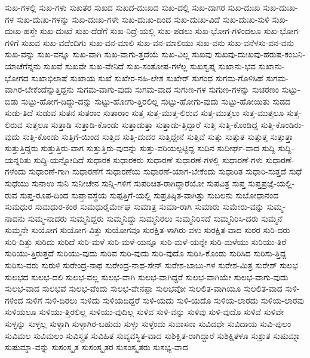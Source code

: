 {ಸುಖ-ಗಳಲ್ಲಿ
ಸುಖ-ಗಳು
ಸುಖತರ
ಸುಖದ
ಸುಖದ-ದುಃಖದ
ಸುಖ-ದಲ್ಲಿ
ಸುಖ-ದಾಗರ
ಸುಖ-ದುಃಖ
ಸುಖ-ದುಃಖ-ಗಳ
ಸುಖ-ದುಃಖ-ಗಳನ್ನು
ಸುಖ-ದುಃಖ-ಗಳೇ
ಸುಖ-ದುಃಖ-ದಿಂದ
ಸುಖ-ದುಃಖ-ವಿದೆ
ಸುಖ-ದುಃಖ-ಸುಳಿ
ಸುಖ-ದುಃಖ-ಹಸ್ತೇ
ಸುಖ-ದುಃಖೆ
ಸುಖ-ದೆಡೆಗೆ
ಸುಖ-ನಿದ್ರೆ-ಯಲ್ಲಿ
ಸುಖ-ಪಡಲು
ಸುಖ-ಭೋಗ-ಗಳಿಂದಲೂ
ಸುಖ-ಭೋಗ-ಗಳಿಗೆ
ಸುಖವ
ಸುಖ-ವದೆಂದಿಗು
ಸುಖ-ವನ-ಮಾಲಿ
ಸುಖ-ವನ-ಮಾಲಿಯು
ಸುಖ-ವನು
ಸುಖ-ವನೆಳಸು-ವನ-ವನು
ಸುಖ-ವನ್ನು
ಸುಖ-ವನ್ನೂ
ಸುಖ-ವಾಗಿ
ಸುಖ-ವಾಗು-ತ್ತದೆಯೆ
ಸುಖ-ವಿಲ್ಲ
ಸುಖವು
ಸುಖವು-ದುಃಖವು-ಹರುಷ-ಕಂಬನಿ-ಯಾಚೆಗೆನ್ನನು
ಸುಖವೆ
ಸುಖವೇ
ಸುಖ-ವೇನಿದೆ
ಸುಖ-ಸಂತೋಷ-ಗಳೆಲ್ಲ
ಸುಖಸ್ವಪ್ನ
ಸುಖಾನು-ಭವ
ಸುಖಾನು-ಭೋಗದ
ಸುಖಾಭಿಲಾಷೆ
ಸುಖಾಯ
ಸುಖೆ
ಸುಖೇರ-ನಹಿ-ಲೇಶ
ಸುಖೇರ್
ಸುಗಂಧ
ಸುಗಮ-ಗೊಳಿಸಿಹೆ
ಸುಗಮ-ವಾಗಿರ-ಬೇಕೆಂದೆನ್ನುತ್ತಿದ್ದನು
ಸುಗಮ-ವಾಗು-ವುದು
ಸುಗಮ-ವಾದ
ಸುಗುಣ-ಗಳ
ಸುಗುಣ-ಗಳನ್ನು
ಸುಚರಣಂ
ಸುಟ್ಟು-ಬಿಡು
ಸುಟ್ಟು-ಹೋಗ-ದಿದ್ದು-ದನ್ನು
ಸುಟ್ಟು-ಹೋಗು-ತ್ತಿರಲಿಲ್ಲ
ಸುಟ್ಟು-ಹೋಗು-ವುದು
ಸುಟ್ಟು-ಹೋಯಿತು
ಸುಡದ
ಸುಡು-ತಿದೆ
ಸುಡುವ
ಸುತನ
ಸುತರಾಂ
ಸುತಾರಾಂ
ಸುತ್ತ
ಸುತ್ತ-ಮುತ್ತ-ಲಿರುವ
ಸುತ್ತ-ಮುತ್ತಲು
ಸುತ್ತ-ಮುತ್ತಲೂ
ಸುತ್ತ-ಲಿರುವ
ಸುತ್ತಲೂ
ಸುತ್ತಾಡಿ
ಸುತ್ತಾಡಿ-ಕೊಂಡು
ಸುತ್ತಾಡುತ್ತಾ
ಸುತ್ತಾಡು-ತ್ತಿದ್ದಾರೆ
ಸುತ್ತಿ
ಸುತ್ತಿ-ಕೊಂಡಿದ್ದ
ಸುತ್ತಿ-ಕೊಂಡಿರು-ವುದು
ಸುತ್ತಿ-ಕೊಂಡು
ಸುತ್ತಿಗೆ-ಯಿಂದ
ಸುತ್ತಿದ
ಸುತ್ತಿ-ದುದರ
ಸುತ್ತಿದ್ದೇನೆ
ಸುತ್ತಿವೆ
ಸುತ್ತು
ಸುತ್ತುತ
ಸುತ್ತುತ್ತ
ಸುತ್ತುತ್ತಾ
ಸುತ್ತುತ್ತಿದ್ದರು
ಸುತ್ತುತ್ತಿರು-ವಾಗ
ಸುತ್ತುತ್ತಿರು-ವುದನ್ನು
ಸುತ್ತು-ವರಿಯಲ್ಪಟ್ಟಿದ್ದ
ಸುದಿನ
ಸುದೀರ್ಘ-ವಾದ
ಸುದ್ದಿ
ಸುದ್ದಿ-ಯನ್ನರಿತು
ಸುದ್ದಿ-ಯನ್ನೋದಿದೆ
ಸುಧಾರಕ
ಸುಧಾರಕರು
ಸುಧಾರಣೆ
ಸುಧಾರಣೆ-ಗಳಲ್ಲಿ
ಸುಧಾರಣೆ-ಗಳು
ಸುಧಾರಣೆ-ಗಳೆಂದು
ಸುಧಾರಣೆ-ಗಾಗಿ
ಸುಧಾರಣೆಗೆ
ಸುಧಾರಣೆಯ
ಸುಧಾರಣೆ-ಯಾಗ-ಬೇಕೆಂದು
ಸುಧಾರಿತ
ಸುಧಾರಿ-ಸುತ್ತದೆ
ಸುಧೆ
ಸುಧೆಯು
ಸುನಾಉ
ಸುನಿ
ಸುನೀಚೇನ
ಸುನ್ನಿ-ಗಳಿಗೆ
ಸುಪರಿಚಿತ-ರಾಗಿದ್ದಾರೆಯೋ
ಸುಪವಿತ್ರ
ಸುಪ್ತ
ಸುಪ್ತಪ್ರಜ್ಞೆ-ಯಲ್ಲಿ-ರುವ
ಸುಪ್ತ-ರೂಪ-ದಿಂದ
ಸುಪ್ತಾವಸ್ಥೆಯ
ಸುಪ್ಪತ್ತಿಗೆ-ಯಲ್ಲಿ
ಸುಪ್ರತಿಷ್ಠಿತ-ವಾಗಿತ್ತು
ಸುಬಲನು
ಸುಬೋಧಾನಂದ
ಸುಮಧುರ
ಸುಮಧುರ-ಕಂಠ
ಸುಮಧುರೈರ್ಮೇಘ
ಸುಮಾತ್ರ
ಸುಮಾ-ರಾಗಿ
ಸುಮಾರು
ಸುಮೇರು-ವನ್ನು
ಸುಮ್ಮ-ನಾದನು
ಸುಮ್ಮ-ನಾದರು
ಸುಮ್ಮನಿದ್ದರು
ಸುಮ್ಮನಿದ್ದು
ಸುಮ್ಮನಿರಲು
ಸುಮ್ಮನಿರಿಸದೆ
ಸುಮ್ಮನಿರಿಸಿ-ದರು
ಸುಮ್ಮನೆ
ಸುಮ್ಮನೇ
ಸುಯೋಗ
ಸುಯೋಗ-ವಿತ್ತು
ಸುಯೋಗವೂ
ಸುರಕ್ಷಿತ-ಳಾಗಿರು-ವಳು
ಸುರಕ್ಷಿತ-ವಾದ
ಸುರರ
ಸುರಿ-ದರು
ಸುರಿ-ದಿತ್ತು
ಸುರಿದು
ಸುರಿದೆ
ಸುರಿ-ಮಳೆ
ಸುರಿ-ಮಳೆ-ಯನ್ನೂ
ಸುರಿ-ಮಳೆ-ಯನ್ನೇ
ಸುರಿ-ಮಳೆಯು
ಸುರಿಯು-ತಿರೆ
ಸುರಿಯು-ತ್ತಿರುತ್ತದೆ
ಸುರಿಯು-ವುದು
ಸುರಿವ
ಸುರಿ-ವುದು
ಸುರಿ-ವುದೊ
ಸುರಿಸಿ-ಕೊಂಡು
ಸುರಿಸಿದ
ಸುರಿಸು-ತ್ತಿದ್ದ
ಸುರಿಸು-ವರು
ಸುರುಳಿ
ಸುರೇಂದ್ರ-ನಾಥ
ಸುರೇಂದ್ರ-ನಾಥ-ಸೇನ್
ಸುರೇಶ-ಬಾಬು-ಗಳ
ಸುರೇಶ-ಮಿತ್ರ
ಸುರೇಶ್
ಸುಲಭ
ಸುಲಭದ
ಸುಲಭ-ದಲಿ
ಸುಲಭ-ವಲ್ಲ
ಸುಲಭ-ವಾಗಿ
ಸುಲಭ-ವಾಗಿದ್ದರೆ
ಸುಲಭ-ವಾಗಿಯೇ
ಸುಲಭ-ವಾಗು-ವುದು
ಸುಲಭ-ವಾದ
ಸುಲಭವೆ
ಸುಲಭ-ವೆಂದು
ಸುಲಭ-ವೇನಪ್ಪಾ
ಸುಲಭವೋ
ಸುಲಲಿತ-ವಾಗಿಯೂ
ಸುಲಲಿತ-ವಾದ
ಸುಳಿ-ಗಳಿಂದ
ಸುಳಿಗೆ
ಸುಳಿ-ದಿರಲು
ಸುಳಿದು
ಸುಳಿಯದಿದ್ದರೆ
ಸುಳಿ-ಯದು
ಸುಳಿ-ಯದೊ
ಸುಳಿಯ-ಲಾರದು
ಸುಳಿಯ-ಲಾರವು
ಸುಳಿಯಲೂ
ಸುಳಿಯು-ತ್ತಿರಲಿಲ್ಲ
ಸುಳಿಯು-ವುದಿಲ್ಲ
ಸುಳಿವ
ಸುಳಿ-ವನ್ನು
ಸುಳಿವು
ಸುಳಿ-ವುದೊ
ಸುಳಿವೆ
ಸುಳಿವೇ
ಸುಳ್ಳನ್ನು
ಸುಳ್ಳಲ್ಲ
ಸುಳ್ಳಾಗಿ
ಸುಳ್ಳಾಗಿರ-ಬಹುದು
ಸುಳ್ಳು
ಸುಳ್ಳೆಂದು
ಸುವಾಸನಾ
ಸುವಿದಧೇ
ಸುವಿದಾಯ
ಸುವಿ-ಪುಲಂ
ಸುವಿಮಲ
ಸುವಿಮಲಂ
ಸುವಿಸ್ತ್ರತ
ಸುವಿಹಿತ
ಸುವ್ಯವಸ್ಥಿತ-ವಾದ
ಸುಶಿಕ್ಷಿತ-ರಾಗಿದ್ದಾರೆ
ಸುಶಿಕ್ಷಿತಳೂ
ಸುಶ್ರುತ
ಸುಷುಮ್ನಾ
ಸುಷುಮ್ನಾ-ವನ್ನು
ಸುಸಂಸ್ಕೃತ
ಸುಸಂಸ್ಕೃತರ
ಸುಸಂಸ್ಕೃತರು
ಸುಸಭ್ಯ-ವಾದ
}
